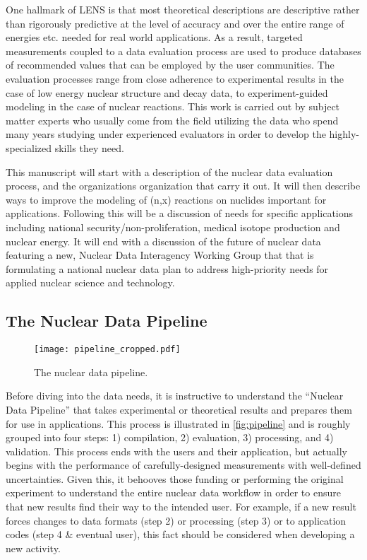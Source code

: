 \documentclass[letterpaper]{ar-1col}
\begin{document}
One hallmark of LENS is that most theoretical descriptions are descriptive rather than rigorously predictive at the level of accuracy and over the entire range of energies etc. needed for real world applications.  As a result, targeted measurements coupled to a data evaluation process are used to produce databases of recommended values that can be employed by the user communities.  The evaluation processes range from close adherence to experimental results in the case of low energy nuclear structure and decay data, to experiment-guided modeling in the case of nuclear reactions. This work is carried out by subject matter experts who usually come from the field utilizing the data who spend many years studying under experienced evaluators in order to develop the highly-specialized skills they need.  

This manuscript will start with a description of the nuclear data evaluation process, and the organizations organization that carry it out.  It will then describe ways to improve the modeling of (n,x) reactions on nuclides important for applications.  Following this will be a discussion of needs for specific applications including national security/non-proliferation, medical isotope production and nuclear energy.  It will end with a discussion of the future of nuclear data featuring  a new, Nuclear Data Interagency Working Group that that is formulating a national nuclear data plan to address high-priority needs for applied nuclear science and technology.   


\subsection{The Nuclear Data Pipeline}


\begin{wrapfigure}{r}{0.4\textwidth}
\centering
\texttt{[image: pipeline\_cropped.pdf]}
\caption{\label{fig:pipeline}The nuclear data pipeline.}
\end{wrapfigure}

Before diving into the data needs, it is instructive to understand the \enquote{Nuclear Data Pipeline} that takes experimental or theoretical results and prepares them for use in applications.  This process is illustrated in \autoref{fig:pipeline} and is roughly grouped into four steps: 1) compilation, 2) evaluation, 3) processing, and 4) validation.  This process ends with the users and their application, but actually begins with the performance of carefully-designed measurements with well-defined uncertainties.  Given this, it behooves those funding or performing the original experiment to understand the entire nuclear data workflow in order to ensure that new results find their way to the intended user.  For example, if a new result forces changes to data formats (step 2) or processing (step 3) or to application codes (step 4 \& eventual user), this fact should be considered when developing a new activity.
\end{document}
